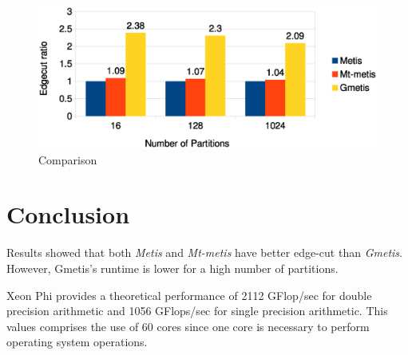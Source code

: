 \documentclass[abstract=on,9pt,twocolumn]{scrartcl}
\begin{document}
\begin{center}
\begin{figure}[htb]
    \includegraphics[width=\columnwidth]{img/edgecut.eps}
    \caption{Comparison}
    \label{img:edgecut}
\end{figure}
\end{center}



\section{Conclusion}
\label{sec:conc}
Results showed that both \textit{Metis} and \textit{Mt-metis} have
better edge-cut than \textit{Gmetis}. However, Gmetis's runtime is lower
for a high number of partitions.


Xeon Phi provides a theoretical performance of 2112 GFlop/sec for double
precision arithmetic and 1056 GFlops/sec for single precision
arithmetic. This values comprises the use of 60 cores since one core is
necessary to perform operating system operations.






\end{document}
